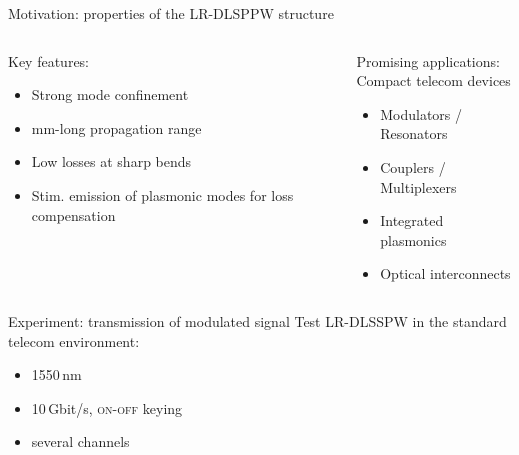   \begin{frame}{Motivation: properties of the LR-DLSPPW structure}
    \begin{columns}
        \begin{block}{Key features:}
          \begin{itemize}
            \item Strong mode confinement%
            \item mm-long propagation range
            \item Low losses at sharp bends
            \item Stim. emission of plasmonic modes for loss compensation
          \end{itemize}
        \end{block}
        \begin{block}{Promising applications:\\
                      Compact telecom devices}
          \begin{itemize}
            \item Modulators / Resonators
            \item Couplers / Multiplexers
            \item Integrated plasmonics
            \item Optical interconnects
          \end{itemize}
        \end{block}
    \end{columns}
    \pause
    \begin{center}
      \begin{minipage}{0.8\textwidth}
        \begin{alertblock}{Experiment: transmission of modulated signal}
          Test LR-DLSSPW in the standard telecom environment:
          \begin{itemize}
            \item 1550\,nm
            \item 10\,Gbit/s, \textsc{on-off} keying
            \item several channels
          \end{itemize}
        \end{alertblock}
      \end{minipage}
    \end{center}
  \end{frame}






